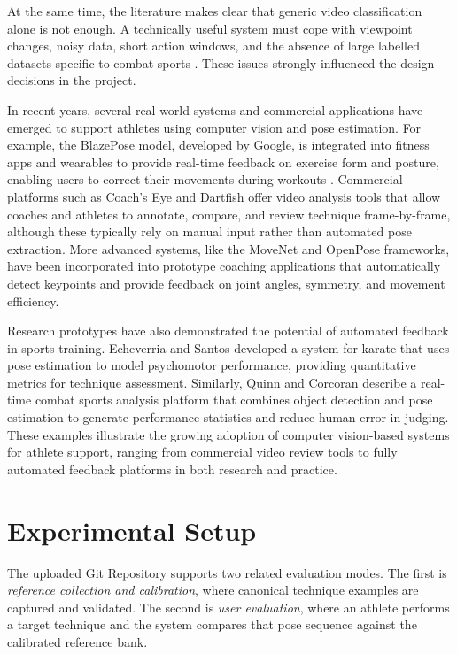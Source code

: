 \documentclass[12pt]{article}
\begin{document}
At the same time, the literature makes clear that generic video classification alone is not enough. A technically useful system must cope with viewpoint changes, noisy data, short action windows, and the absence of large labelled datasets specific to combat sports \cite{wu2024sthka,quinn2025yolo}. These issues strongly influenced the design decisions in the project.

In recent years, several real-world systems and commercial applications have emerged to support athletes using computer vision and pose estimation. For example, the BlazePose model, developed by Google, is integrated into fitness apps and wearables to provide real-time feedback on exercise form and posture, enabling users to correct their movements during workouts \cite{wu2024sthka}. Commercial platforms such as Coach's Eye and Dartfish offer video analysis tools that allow coaches and athletes to annotate, compare, and review technique frame-by-frame, although these typically rely on manual input rather than automated pose extraction. More advanced systems, like the MoveNet and OpenPose frameworks, have been incorporated into prototype coaching applications that automatically detect keypoints and provide feedback on joint angles, symmetry, and movement efficiency.

Research prototypes have also demonstrated the potential of automated feedback in sports training. Echeverria and Santos \cite{echeverria2021pose} developed a system for karate that uses pose estimation to model psychomotor performance, providing quantitative metrics for technique assessment. Similarly, Quinn and Corcoran \cite{quinn2024automation} describe a real-time combat sports analysis platform that combines object detection and pose estimation to generate performance statistics and reduce human error in judging. These examples illustrate the growing adoption of computer vision-based systems for athlete support, ranging from commercial video review tools to fully automated feedback platforms in both research and practice.

\section{Experimental Setup}
The uploaded Git Repository supports two related evaluation modes. The first is \textit{reference collection and calibration}, where canonical technique examples are captured and validated. The second is \textit{user evaluation}, where an athlete performs a target technique and the system compares that pose sequence against the calibrated reference bank.
\end{document}
